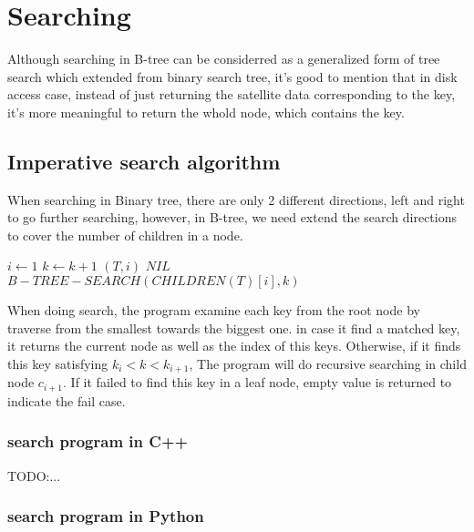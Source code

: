 \documentclass{article}
\begin{document}
\section{Searching} 

Although searching in B-tree can be considerred as a generalized
form of tree search which extended from binary search tree, it's good
to mention that in disk access case, instead of just returning the
satellite data corresponding to the key, it's more meaningful to
return the whold node, which contains the key.

\subsection{Imperative search algorithm}

When searching in Binary tree, there are only 2 different directions,
left and right to go further searching, however, in B-tree, we need
extend the search directions to cover the number of children in a
node.

\begin{algorithmic}[1]
  \State $i \gets 1$
    \State $k \gets k+1$
  \EndWhile
    \State \Return $(T, i)$
  \EndIf
    \State \Return $NIL$ 
  \Else
    \State \Return $B-TREE-SEARCH(CHILDREN(T)[i], k)$
  \EndIf
\EndFunction
\end{algorithmic}

When doing search, the program examine each key from the root node by
traverse from the smallest towards the biggest one. in case it find a
matched key, it returns the current node as well as the index of this
keys. Otherwise, if it finds this key satisfying $k_i < k < k_{i+1}$, 
The program will do recursive searching in child node $c_{i+1}$. If it
failed to find this key in a leaf node, empty value is returned to
indicate the fail case.

\subsubsection*{search program in C++}
TODO:...

\subsubsection*{search program in Python}
\end{document}
